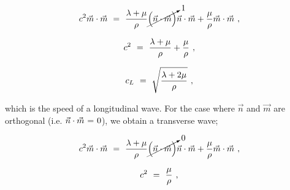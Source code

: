 \documentclass{article}
\begin{document}
\begin{equation} \label{eq:1}
c^2 \vec{m} \cdot \vec{m} \hspace{0.125cm} = \hspace{0.125cm} \frac{\lambda + \mu}{\rho} \cancelto{1}{\Big( \vec{n} \cdot \vec{m} \Big)} \vec{n} \cdot \vec{m} + \frac{\mu}{\rho} \vec{m} \cdot \vec{m} \hspace{0.125cm}  ,
\end{equation}

\begin{equation} \label{eq:1}
c^2  \hspace{0.125cm} = \hspace{0.125cm} \frac{\lambda + \mu}{\rho} + \frac{\mu}{\rho} \hspace{0.125cm}  ,
\end{equation}

\begin{equation} \label{eq:1}
c_L  \hspace{0.125cm} = \hspace{0.125cm} \sqrt{\frac{\lambda + 2 \mu}{\rho}} \hspace{0.125cm}  ,
\end{equation}

which is the speed of a longitudinal wave. For the case where \begin{math} \vec{n} \end{math} and \begin{math} \vec{m} \end{math} are orthogonal (i.e.  \begin{math} \vec{n} \cdot \vec{m} \hspace{0.025cm} = \hspace{0.025cm} 0 \end{math}), we obtain a transverse wave;

\begin{equation} \label{eq:1}
c^2 \vec{m} \cdot \vec{m} \hspace{0.125cm} = \hspace{0.125cm} \frac{\lambda + \mu}{\rho} \cancelto{0}{\Big( \vec{n} \cdot \vec{m} \Big)} \vec{n} \cdot \vec{m} + \frac{\mu}{\rho} \vec{m} \cdot \vec{m} \hspace{0.125cm}  ,
\end{equation}

\begin{equation} \label{eq:1}
c^2  \hspace{0.125cm} = \hspace{0.125cm} \frac{\mu}{\rho} \hspace{0.125cm}  ,
\end{equation}
\end{document}
